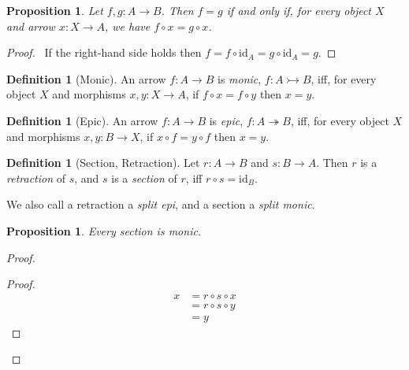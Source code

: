 \documentclass{article}
\let\qed\relax
\newtheorem{proposition}[axiom]{Proposition}
\theoremstyle{definition}
\newtheorem{definition}[axiom]{Definition}
\newcommand{\id}[1]{\ensuremath{\mathrm{id}_{#1}}}
\begin{document}
\begin{proposition}
    Let $f, g : A \rightarrow B$. Then $f = g$ if and only if, for every object $X$
    and arrow $x : X \rightarrow A$, we have $f \circ x = g \circ x$.
\end{proposition}

\begin{proof}
    \pf\ If the right-hand side holds then $f = f \circ \id{A} = g \circ \id{A} = g$. \qed
\end{proof}

\begin{definition}[Monic]
    An arrow $f : A \rightarrow B$ is \emph{monic}, $f : A \rightarrowtail B$, iff,
    for every object $X$ and morphisms $x, y : X \rightarrow A$, if $f \circ x =
    f \circ y$ then $x = y$.
\end{definition}

\begin{definition}[Epic]
    An arrow $f : A \rightarrow B$ is \emph{epic}, $f : A \twoheadrightarrow B$, iff,
    for every object $X$ and morphisms $x, y : B \rightarrow X$, if $x \circ f =
    y \circ f$ then $x = y$.
\end{definition}

\begin{definition}[Section, Retraction]
    Let $r : A \rightarrow B$ and $s : B \rightarrow A$. Then $r$ is a \emph{retraction}
    of $s$, and $s$ is a \emph{section} of $r$, iff $r \circ s = \id{B}$.

    We also call a retraction a \emph{split epi}, and a section a \emph{split monic}.
\end{definition}

\begin{proposition}
    \label{proposition:section_monic}
    Every section is monic.
\end{proposition}

\begin{proof}
    \pf
    \begin{proof}
        \pf
        \begin{align*}
            x & = r \circ s \circ x \\
            & = r \circ s \circ y \\
            & = y
        \end{align*}
    \end{proof}
    \qed
\end{proof}
\end{document}
